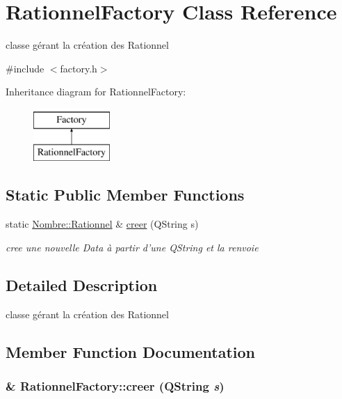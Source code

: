 \hypertarget{classRationnelFactory}{
\section{RationnelFactory Class Reference}
\label{classRationnelFactory}
}


classe gérant la création des Rationnel  




{\ttfamily \#include $<$factory.h$>$}

Inheritance diagram for RationnelFactory:\begin{figure}[H]
\begin{center}
\leavevmode
\includegraphics[height=2cm]{classRationnelFactory}
\end{center}
\end{figure}
\subsection*{Static Public Member Functions}
\begin{DoxyCompactItemize}
\item 
static \hyperlink{classNombre_1_1Rationnel}{Nombre::Rationnel} \& \hyperlink{classRationnelFactory_aefce747781195682e508436186875fca}{creer} (QString s)
\begin{DoxyCompactList}\small\item\em cree une nouvelle Data à partir d'une QString et la renvoie \item\end{DoxyCompactList}\end{DoxyCompactItemize}


\subsection{Detailed Description}
classe gérant la création des Rationnel 

\subsection{Member Function Documentation}
\hypertarget{classRationnelFactory_aefce747781195682e508436186875fca}{
\subsubsection[{creer}]{ \& RationnelFactory::creer (QString {\em s})}}
\label{classRationnelFactory_aefce747781195682e508436186875fca}


